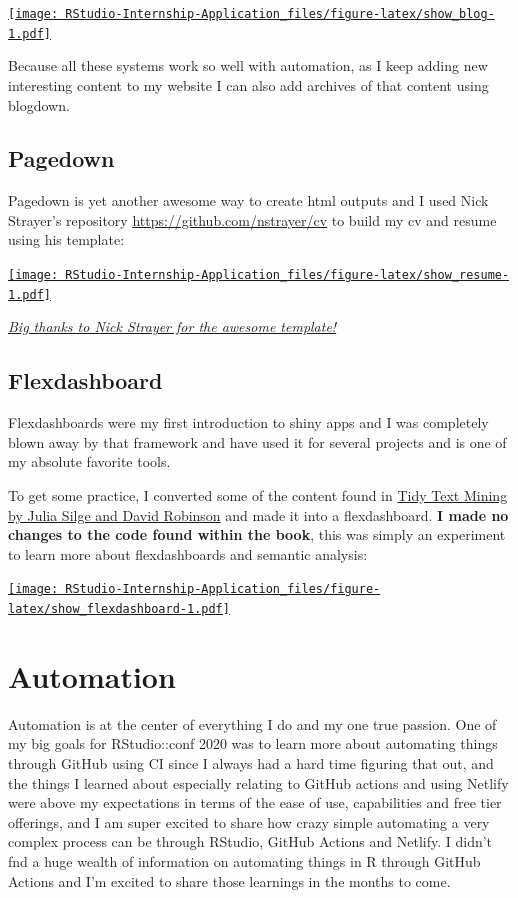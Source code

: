\documentclass[
]{book}
\begin{document}
\href{https://predictcryptoblog.com/}{\texttt{[image: RStudio-Internship-Application\_files/figure-latex/show\_blog-1.pdf]}}

Because all these systems work so well with automation, as I keep adding new interesting content to my website I can also add archives of that content using blogdown.

\hypertarget{pagedown}{%
\subsection{Pagedown}\label{pagedown}}

Pagedown\citep{R-pagedown} is yet another awesome way to create html outputs and I used Nick Strayer's repository \url{https://github.com/nstrayer/cv} to build my cv and resume using his template:

\href{https://ricky-cv.netlify.com/resume}{\texttt{[image: RStudio-Internship-Application\_files/figure-latex/show\_resume-1.pdf]}}

\emph{\href{https://github.com/nstrayer/cv}{Big thanks to Nick Strayer for the awesome template!}}

\hypertarget{flexdashboard}{%
\subsection{Flexdashboard}\label{flexdashboard}}

Flexdashboards \citep{R-flexdashboard} were my first introduction to shiny apps and I was completely blown away by that framework and have used it for several projects and is one of my absolute favorite tools.

To get some practice, I converted some of the content found in \href{https://www.tidytextmining.com/}{Tidy Text Mining by Julia Silge and David Robinson} and made it into a flexdashboard. \textbf{I made no changes to the code found within the book}, this was simply an experiment to learn more about flexdashboards and semantic analysis:

\href{https://predictcrypto.shinyapps.io/SemanticAnalysisExample/}{\texttt{[image: RStudio-Internship-Application\_files/figure-latex/show\_flexdashboard-1.pdf]}}

\hypertarget{automation}{%
\section{Automation}\label{automation}}

Automation is at the center of everything I do and my one true passion. One of my big goals for RStudio::conf 2020 was to learn more about automating things through GitHub using CI since I always had a hard time figuring that out, and the things I learned about especially relating to GitHub actions and using Netlify were above my expectations in terms of the ease of use, capabilities and free tier offerings, and I am super excited to share how crazy simple automating a very complex process can be through RStudio, GitHub Actions and Netlify. I didn't fnd a huge wealth of information on automating things in R through GitHub Actions and I'm excited to share those learnings in the months to come.
\end{document}
